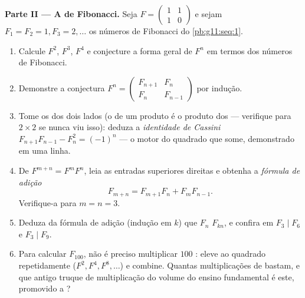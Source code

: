\begin{problem}
\medskip
\noindent\textbf{Parte II --- A  de Fibonacci.}
Seja $F = \begin{pmatrix} 1 & 1\\ 1 & 0\end{pmatrix}$ e sejam
$F_1 = F_2 = 1, F_3 = 2, \dots$ os números de Fibonacci do
\cref{pb:g11:seq:1}.
\begin{enumerate}[resume]
  \item Calcule $F^2$, $F^3$, $F^4$ e conjecture a forma geral
        de $F^n$ em termos dos números de Fibonacci.
  \item Demonstre a conjectura
        $F^n = \begin{pmatrix} F_{n+1} & F_n\\ F_n & F_{n-1}
        \end{pmatrix}$ por indução.
  \item Tome os  dos dois lados (o  de
        um produto é o produto dos  --- verifique
        para  $2 \times 2$ se nunca viu isso): deduza a
        \emph{identidade de Cassini}
        $F_{n+1}F_{n-1} - F_n^2 = (-1)^n$ --- o motor do
        quadrado que some, demonstrado em uma linha.
  \item De $F^{m+n} = F^m F^n$, leia as entradas superiores
        direitas e obtenha a \emph{fórmula de adição}
        \[
        F_{m+n} = F_{m+1} F_n + F_m F_{n-1} .
        \]
        Verifique-a para $m = n = 3$.
  \item Deduza da fórmula de adição (indução em $k$)
        que $F_n$  $F_{kn}$, e confira em
        $F_3 \mid F_6$ e $F_3 \mid F_9$.
  \item Para calcular $F_{100}$, não é preciso multiplicar $100$
        : eleve ao quadrado repetidamente ($F^2, F^4,
        F^8, \dots$) e combine. Quantas multiplicações de
         bastam, e que antigo truque de multiplicação do
        volume do ensino fundamental é este, promovido a
        ?
\end{enumerate}


\end{problem}
